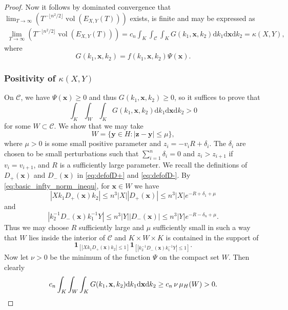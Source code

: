 \documentclass[11pt,reqno]{amsart}
\theoremstyle{definition}
\theoremstyle{remark}
\newcommand{\vol}{\operatorname{vol}}
\numberwithin{equation}{section}
\numberwithin{thm}{section}
\numberwithin{table}{section}
\newcommand{\y}{\mathbf{y}}
\newcommand{\x}{\mathbf{x}}
\begin{document}
\begin{proof}
      Now it follows by dominated convergence  that $\lim_{T \to \infty}  (T^{-\lfloor n^2 / 2 \rfloor} \vol(E_{X,Y}(T)))$ exists, is finite and may be expressed as
      \begin{align*}
          \lim_{T \to \infty}  (T^{-\lfloor n^2 / 2 \rfloor} \vol(E_{X,Y}(T)))  
          =
          c_n
          \int_{K} \int_{\mathcal{C}} \int_{K}
          G(k_1,\x,k_2)
          \mathrm{d} k_1
        \mathrm{d} \x
        \mathrm{d} k_2 
        = \kappa(X,Y),
      \end{align*}
      where 
      \[
      G(k_1,\x,k_2) = f(k_1,\mathbf{x},k_2)\Psi(\x).
      \]

\subsubsection*{Positivity of $\kappa(X,Y)$} 
On $\mathcal{C}$, we have $\Psi(\x) \ge 0$ and thus $G(k_1,\x,k_2) \ge 0$, so it suffices to prove that 
      \[
       \int_{K} \int_{W} \int_{K}
          G(k_1,\x,k_2)
          \mathrm{d} k_1
        \mathrm{d} \x
        \mathrm{d} k_2 > 0
      \]
      for some $W \subset \mathcal{C}$. We show that we may take 
      \[
      W = \{
      \y \in H: | \mathbf{z} - \y | \le \mu
      \}, 
      \]
      where $\mu>0$ is some small positive parameter and
$       z_i = - v_i R + \delta_i.
 $
       The $\delta_i$ are chosen to be small perturbations such that $\sum_{i=1}^n \delta_i =0$ and 
      $z_i > z_{i+1}$ if $v_i = v_{i+1}$, and $R$ is a sufficiently large parameter. 
      We recall the definitions of $D_+(\x)$ and $D_-(\x)$ in \eqref{eq:defofD+} and \eqref{eq:defofD-}. 
      By \eqref{eq:basic_infty_norm_inequ}, for $\x \in W$ we have 
      \[
      | X k_1 D_+(\mathbf{x}) k_2| \le
      n^3 | X|  | D_+(\mathbf{x})| \leq
      n^3 | X| e^{-R + \delta_1 + \mu }
      \]
      and
      \[
      |  k_2^{-1} D_-(\mathbf{x}) k_1^{-1} Y|\le n^3 | Y| |   D_-(\mathbf{x})| \leq  n^3 | Y| e^{-R -\delta_n + \mu}.
      \]
      Thus we may choose $R$ sufficiently large and $\mu$ sufficiently small in such a way that $W$ lies inside the interior of $\mathcal{C}$ and $K \times W \times K$ is contained in the support of 
      \[
      \mathbf{1}_{[| X k_1 D_+(\mathbf{x}) k_2|\le 1]}
      \mathbf{1}_{[|  k_2^{-1} D_-(\mathbf{x}) k_1^{-1} Y|\le 1]}
      .
      \]
      Now let $ \nu >0$ be the minimum of the function $\Psi$ on the compact set $W$. Then clearly 
      \[
      c_n 
       \int_{K} \int_{W} \int_{K}
          G(k_1,\x,k_2)
          \mathrm{d} k_1
        \mathrm{d} \x
        \mathrm{d} k_2 \ge c_n  \, \nu \, \mu_H(  W )>0. \qedhere
      \]
\end{proof}
\end{document}
